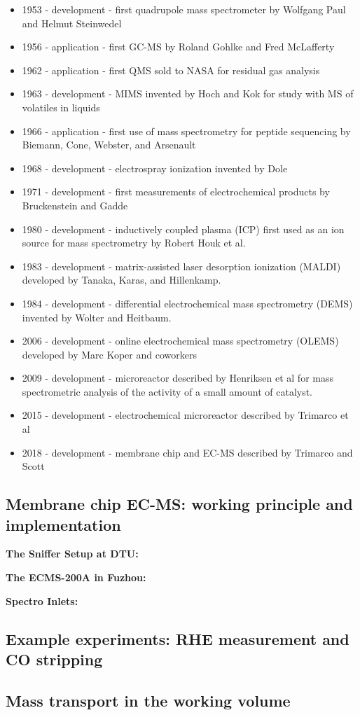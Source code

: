 \begin{itemize}
	\item 1953 - development - first quadrupole mass spectrometer by Wolfgang Paul and Helmut Steinwedel
	\item 1956 - application - first GC-MS by Roland Gohlke and Fred McLafferty
	\item 1962 - application - first QMS sold to NASA for residual gas analysis
	\item 1963 - development - MIMS invented by Hoch and Kok for study with MS of volatiles in liquids
	\item 1966 - application - first use of mass spectrometry for peptide sequencing by Biemann, Cone, Webster, and Arsenault
	\item 1968 - development - electrospray ionization invented by Dole
	\item 1971 - development - first measurements of electrochemical products by Bruckenstein and Gadde
	\item 1980 - development - inductively coupled plasma (ICP) first used as an ion source for mass spectrometry by Robert Houk et al.
	\item 1983 - development - matrix-assisted laser desorption ionization (MALDI) developed by Tanaka, Karas, and Hillenkamp.
	\item 1984 - development - differential electrochemical mass spectrometry (DEMS) invented by Wolter and Heitbaum. 
	\item 2006 - development - online electrochemical mass spectrometry (OLEMS) developed by Marc Koper and coworkers
	\item 2009 - development - microreactor described by Henriksen et al for mass spectrometric analysis of the activity of a small amount of catalyst.
	\item 2015 - development - electrochemical microreactor described by Trimarco et al
	\item 2018 - development - membrane chip and EC-MS described by Trimarco and Scott
\end{itemize}




\subsection{Membrane chip EC-MS: working principle and implementation}\label{subsec:setups}

\textbf{\large The Sniffer Setup at DTU:}


\textbf{\large The ECMS-200A in Fuzhou:}


\textbf{\large Spectro Inlets:}


\subsection{Example experiments: RHE measurement and CO stripping}\label{sec:examples}

\subsection{Mass transport in the working volume}



